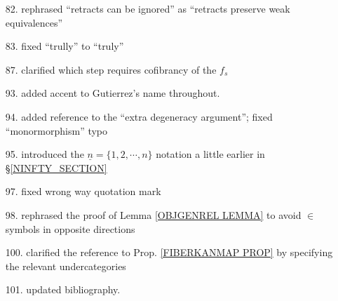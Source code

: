 \documentclass{article}
\begin{document}
\begin{itemize}
\item[82.] rephrased ``retracts can be ignored''
as ``retracts preserve weak equivalences''

\item[83.] fixed ``trully'' to ``truly''

\item[87.] clarified which step requires cofibrancy of the 
$f_s$

\item[93.] added accent to Gutierrez's name throughout.

\item[94.] added \cite{Ri14} reference to the ``extra degeneracy argument''; fixed ``monormorphism'' typo

\item[95.] introduced the 
$\underline{n} = \{1,2,\cdots,n\}$
notation a little earlier in \S \ref{NINFTY_SECTION}

\item[97.] fixed wrong way quotation mark

\item[98.] rephrased the proof of Lemma \ref{OBJGENREL LEMMA}
to avoid $\in$ symbols in opposite directions

\item[100.] clarified the reference to Prop. \ref{FIBERKANMAP PROP} by specifying the relevant undercategories

\item[101.] updated bibliography.

\end{itemize}








{}


\end{document}
